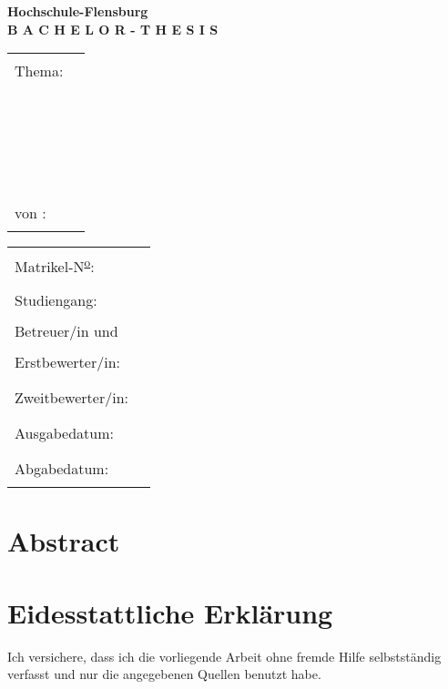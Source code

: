 \documentclass[a4paper, 10pt, DIV=13, BCOR=8mm]{scrbook}
\begin{document}
\begin{titlepage}
  \begin{center}
    \Large \textbf{Hochschule-Flensburg}
    \\[2\normalbaselineskip]
    \Huge \textbf{B A C H E L O R - T H E S I S}
  \end{center}
  
	\begin{tabular}{@{}p{2.5cm}@{} @{}p{12cm}@{}}
    \\[4\normalbaselineskip]
    \large Thema: & \hrule
    \\[2\normalbaselineskip]
    & \hrule
    \\[2\normalbaselineskip]
    & \hrule
    \\[2\normalbaselineskip]
    & \hrule
    \\[3\normalbaselineskip]
    \large von : & \hrule
  \end{tabular}\hspace{2ex}

  \begin{tabular}{@{}p{3.5cm}@{} @{}p{7.5cm}@{}}
    \\[4\normalbaselineskip]
    \large Matrikel-N\textsuperscript{\underline{o}}: & \hrule
    \\[1.5\normalbaselineskip]
    \large Studiengang: & \hrule
    \\[1.5\normalbaselineskip]
    \large Betreuer/in und \\
    \large Erstbewerter/in: & \hrule
    \\[1.5\normalbaselineskip]
    \large Zweitbewerter/in: & \hrule
    \\[1.5\normalbaselineskip]
    \large Ausgabedatum: & \hrule
    \\[1.5\normalbaselineskip]
    \large Abgabedatum: & \hrule
  \end{tabular}
\end{titlepage}

\chapter*{Abstract}

\blindtext



\chapter*{Eidesstattliche Erklärung}

Ich versichere, dass ich die vorliegende Arbeit ohne fremde Hilfe selbstständig verfasst und nur die angegebenen Quellen benutzt habe.
\end{document}

